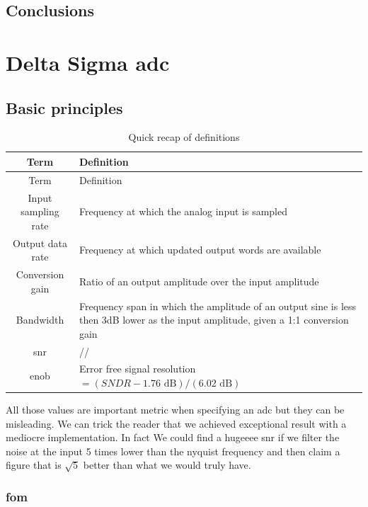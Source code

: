 \documentclass[
  a4paper,
]{article}
\begin{document}
\hypertarget{conclusions}{%
\subsection{Conclusions}\label{conclusions}}

\hypertarget{delta-sigma-adc}{%
\section{\texorpdfstring{Delta Sigma
{adc}}{Delta Sigma adc}}\label{delta-sigma-adc}}

\hypertarget{basic-principles}{%
\subsection{Basic principles}\label{basic-principles}}

\hypertarget{tab:my_label}{}
\begin{longtable}[]{@{}cl@{}}
\caption{Quick recap of definitions}\tabularnewline
\toprule\noalign{}
Term & Definition \\
\midrule\noalign{}
\endfirsthead
\toprule\noalign{}
Term & Definition \\
\midrule\noalign{}
\endhead
\bottomrule\noalign{}
\endlastfoot
Input sampling rate & Frequency at which the analog input is sampled \\
Output data rate & Frequency at which updated output words are
available \\
Conversion gain & Ratio of an output amplitude over the input
amplitude \\
Bandwidth & Frequency span in which the amplitude of an output sine is
less then 3dB lower as the input amplitude, given a 1:1 conversion
gain \\
{snr} & // \\
{enob} & Error free signal resolution
\(=(SNDR-1.76\text{ dB})/(6.02 \text{ dB})\) \\
\end{longtable}

All those values are important metric when specifying an {adc} but they
can be misleading. We can trick the reader that we achieved exceptional
result with a mediocre implementation. In fact We could find a hugeeee
{snr} if we filter the noise at the input 5 times lower than the nyquist
frequency and then claim a figure that is \(\sqrt{5}\) better than what
we would truly have.

\hypertarget{fom}{%
\subsubsection{\texorpdfstring{{fom}}{fom}}\label{fom}}
\end{document}
